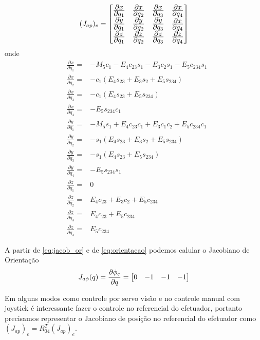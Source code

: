 \begin{equation}
({J}_{ap})_e = 
\begin{bmatrix}
	\frac{\displaystyle \partial x}{\displaystyle \partial q_1} & \frac{\displaystyle \partial x}{\displaystyle \partial q_2} & \frac{\displaystyle \partial x}{\displaystyle \partial q_3} & \frac{\displaystyle \partial x}{\displaystyle \partial q_4}  \\
	\frac{\displaystyle \partial y}{\displaystyle \partial q_1} & \frac{\displaystyle \partial y}{\displaystyle \partial q_2} & \frac{\displaystyle \partial y}{\displaystyle \partial q_3} & \frac{\displaystyle \partial x}{\displaystyle \partial q_4}  \\
	\frac{\displaystyle \partial z}{\displaystyle \partial q_1} & \frac{\displaystyle \partial z}{\displaystyle \partial q_2} & \frac{\displaystyle \partial z}{\displaystyle \partial q_3} & \frac{\displaystyle \partial z}{\displaystyle \partial q_4}  \\
\end{bmatrix}
\end{equation}
onde
\begin{align*}
&\frac{\partial x}{\partial q_1} =& - M_5c_1 - E_4c_{23}s_1 - E_3c_2s_1 - E_5c_{234}s_1  \\
&\frac{\partial x}{\partial q_2} =& -c_1(E_4s_{23}+E_3s_2+E_5s_{234}) \\
&\frac{\partial x}{\partial q_3} =& -c_1(E_4s_{23}+E_5s_{234}) \\
&\frac{\partial x}{\partial q_4} =& -E_5s_{234}c_1 \\
&\frac{\partial y}{\partial q_1} =& -M_5s_1+E_4c_{23}c_1+E_3c_1c_2+E_5c_{234}c_1 \\
&\frac{\partial y}{\partial q_2} =& -s_1(E_4s_{23}+E_3s_2+E_5s_{234}) \\
&\frac{\partial y}{\partial q_3} =& -s_1(E_4s_{23}+E_5s_{234}) \\
&\frac{\partial y}{\partial q_4} =& -E_5s_{234}s_1 \\ 
&\frac{\partial z}{\partial q_1} =& 0 \\ 
&\frac{\partial z}{\partial q_2} =& E_4c_{23}+E_3c_2+E_5c_{234} \\
&\frac{\partial z}{\partial q_3} =& E_4c_{23}+E_5c_{234}\\
&\frac{\partial z}{\partial q_4} =& E_{5}c_{234} 
\end{align*}

A partir de \ref{eq:jacob_or} e de \ref{eq:orientacao} podemos calular o Jacobiano de Orientação
\begin{equation}
{J}_{a\phi}({q}) = \frac{\partial \phi_e}{\partial {q}} = \begin{bmatrix}0 & -1 & -1 & -1\end{bmatrix}
\end{equation}
 
Em alguns modos como controle por servo visão e no controle manual com joystick é interessante fazer o controle no referencial do efetuador, portanto precisamos representar o Jacobiano de posição no referencial do efetuador como $({J}_{ap})_e = {R}_{04}^T ({J}_{ap})_e$.  

